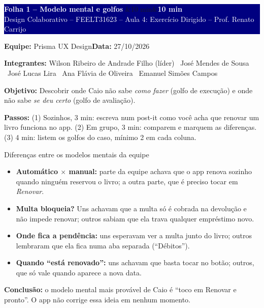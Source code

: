 \documentclass[10pt,a4paper]{article}
\newcommand{\equipenome}{Prisma UX Design}
\newcommand{\dataentrega}{27/10/2026}
\newcommand{\integrantes}{Wilson Ribeiro de Andrade Filho (líder) \textbullet\ José Mendes de Sousa \textbullet\ José Lucas Lira \textbullet\ Ana Flávia de Oliveira \textbullet\ Emanuel Simões Campos}
\newcommand{\folha}[2]{%
  \noindent
  \colorbox{navy}{\parbox{\dimexpr\linewidth-2\fboxsep\relax}{%
    \vspace{3pt}%
    \textcolor{white}{\bfseries\large #1}\hfill
    \ifx&#2&\else\colorbox{laranja}{\textcolor{white}{\bfseries\small #2}}\fi\\[1pt]
    \textcolor{white}{\scriptsize Design Colaborativo -- FEELT31623 -- Aula 4: Exercício Dirigido -- Prof. Renato Carrijo}%
    \vspace{3pt}}}%
  \par\vspace{5pt}
  {\small\textbf{Equipe:} \equipenome\hfill\textbf{Data:} \dataentrega\par}
  {\scriptsize\color{subtle}\textbf{Integrantes:} \integrantes\par}
  \vspace{4pt}}
\newcommand{\objetivo}[1]{%
  \begin{tcolorbox}[colback=laranjabg,colframe=laranja,boxrule=0.5pt,arc=0pt,
    left=3pt,right=3pt,top=1pt,bottom=1pt,fontupper=\small]
  \textbf{Objetivo:} #1
  \end{tcolorbox}\vspace{-4pt}}
\newcommand{\passos}[1]{{\footnotesize\textbf{Passos:} #1\par}\vspace{4pt}}
\begin{document}
\newpage
\folha{Folha 1 -- Modelo mental e golfos}{10 min}
\objetivo{Descobrir onde Caio não sabe \textit{como fazer} (golfo de execução) e onde não sabe \textit{se deu certo} (golfo de avaliação).}
\passos{(1) Sozinhos, 3 min: escreva num post-it como você acha que renovar um livro funciona no app. (2) Em grupo, 3 min: comparem e marquem as diferenças. (3) 4 min: listem os golfos do caso, mínimo 2 em cada coluna.}

\begin{caixa}{Diferenças entre os modelos mentais da equipe}
\begin{itemize}
  \item \textbf{Automático $\times$ manual:} parte da equipe achava que o app renova sozinho quando ninguém reservou o livro; a outra parte, que é preciso tocar em \textit{Renovar}.
  \item \textbf{Multa bloqueia?} Uns achavam que a multa só é cobrada na devolução e não impede renovar; outros sabiam que ela trava qualquer empréstimo novo.
  \item \textbf{Onde fica a pendência:} uns esperavam ver a multa junto do livro; outros lembraram que ela fica numa aba separada (``Débitos'').
  \item \textbf{Quando ``está renovado'':} uns achavam que basta tocar no botão; outros, que só vale quando aparece a nova data.
\end{itemize}
\textbf{Conclusão:} o modelo mental mais provável de Caio é ``toco em Renovar e pronto''. O app não corrige essa ideia em nenhum momento.
\end{caixa}
\end{document}
